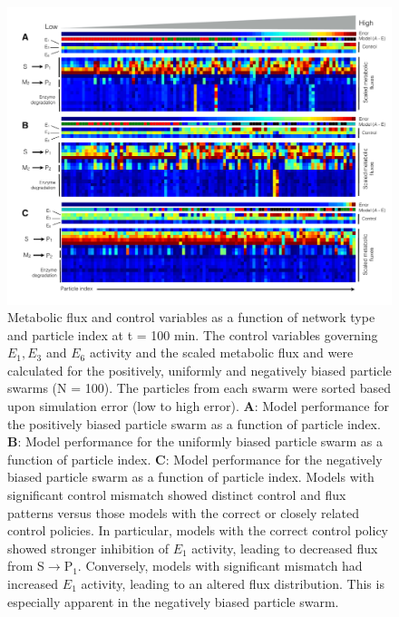 \documentclass[processes,article,accept,moreauthors,pdftex,12pt,a4paper]{mdpi}
\begin{document}
\begin{figure}[H]
\centering
\includegraphics[width=1.0\textwidth,height=0.6\textheight]{./figs/Figure-8-Flux.pdf}
\caption{Metabolic flux and control variables as a function of network type and particle index at t = 100 min.
The control variables governing $E_{1},E_{3}$ and $E_{6}$ activity and the scaled metabolic flux and were calculated for the positively, 
uniformly and negatively biased particle swarms (N = 100). The particles from each swarm were sorted based upon simulation error (low to high error). 
\textbf{A}: Model performance for the positively biased particle swarm as a function of particle index.
\textbf{B}: Model performance for the uniformly biased particle swarm as a function of particle index.
\textbf{C}: Model performance for the negatively biased particle swarm as a function of particle index. 
Models with significant control mismatch showed distinct control and flux patterns versus those models with the correct or closely related control policies.
In particular, models with the correct control policy showed stronger inhibition of $E_{1}$ activity, leading to decreased flux from S$\rightarrow$P$_{1}$.
Conversely, models with significant mismatch had increased $E_{1}$ activity, leading to an altered flux distribution. 
This is especially apparent in the negatively biased particle swarm. 
}\label{fig-flux-pattern}
\end{figure}
\end{document}

